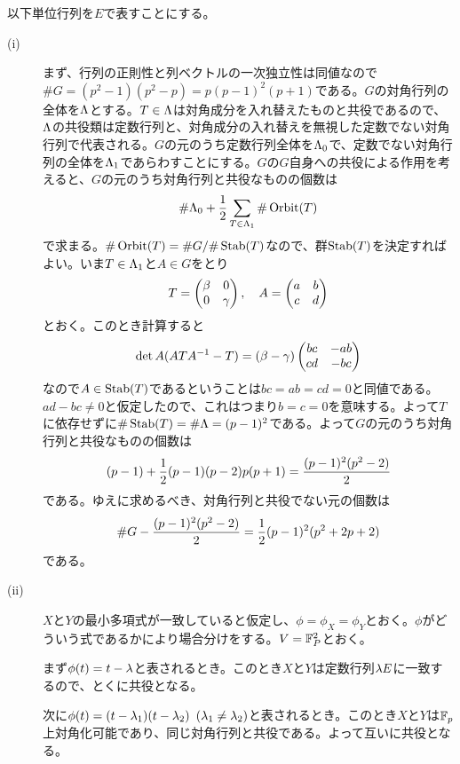 \begin{sol} 以下単位行列を$E$で表すことにする。
  \begin{description}
    \item[(i)] まず、行列の正則性と列ベクトルの一次独立性は同値なので$\# G= (p^2-1)(p^2 - p) = p(p-1)^2(p+1)$である。$G$の対角行列の全体を${\Lambda}$とする。$T \in {\Lambda}$は対角成分を入れ替えたものと共役であるので、${\Lambda}$の共役類は定数行列と、対角成分の入れ替えを無視した定数でない対角行列で代表される。$G$の元のうち定数行列全体を${\Lambda}_0$で、定数でない対角行列の全体を${\Lambda}_1$であらわすことにする。$G$の$G$自身への共役による作用を考えると、$G$の元のうち対角行列と共役なものの個数は
    \[
    \# {\Lambda}_0 + \frac{1}{2} \sum_{T \in {\Lambda}_1} \# \operatorname{Orbit} (T)
    \]
    で求まる。$\# \operatorname{Orbit} (T) = \# G / \# \operatorname{Stab} (T)$なので、群$\operatorname{Stab} (T)$を決定すればよい。いま$T \in {\Lambda}_1$と$A \in G$をとり
    \[
    T = \begin{pmatrix}  \beta & 0 \\ 0 & {\gamma} \end{pmatrix}, \quad A = \begin{pmatrix} a & b\\ c & d \end{pmatrix}
    \]
    とおく。このとき計算すると
    \[
    \det A ( ATA^{-1} - T) = (\beta - {\gamma}) \begin{pmatrix} bc & -ab \\ cd & -bc \end{pmatrix}
    \]
    なので$A \in \operatorname{Stab} (T)$であるということは$bc = ab = cd = 0$と同値である。$ad-bc \neq 0$と仮定したので、これはつまり$b=c=0$を意味する。よって$T$に依存せずに$\# \operatorname{Stab}(T) =\# {\Lambda}= (p-1)^2$である。よって$G$の元のうち対角行列と共役なものの個数は
    \[
    (p-1) + \frac{1}{2} (p-1)(p-2) p(p+1) = \frac{(p-1)^2 (p^2 -2)}{2}
    \]
    である。ゆえに求めるべき、対角行列と共役でない元の個数は
    \[
    \# G - \frac{(p-1)^2 (p^2 -2)}{2} = \frac{1}{2} (p-1)^2 (p^2 + 2p +2)
    \]
    である。
    \item[(ii)] $X$と$Y$の最小多項式が一致していると仮定し、$\phi = \phi_X = \phi_Y$とおく。$\phi$がどういう式であるかにより場合分けをする。$V = {\mathbb F}_P^2$とおく。

    まず$\phi(t) = t - {\lambda}$と表されるとき。このとき$X$と$Y$は定数行列${\lambda} E$に一致するので、とくに共役となる。

    次に$\phi(t) = (t- {\lambda}_1)(t-{\lambda}_2)$ $({\lambda}_1 \neq {\lambda}_2)$と表されるとき。このとき$X$と$Y$は${\mathbb F}_p$上対角化可能であり、同じ対角行列と共役である。よって互いに共役となる。


\end{description}
\end{sol}
